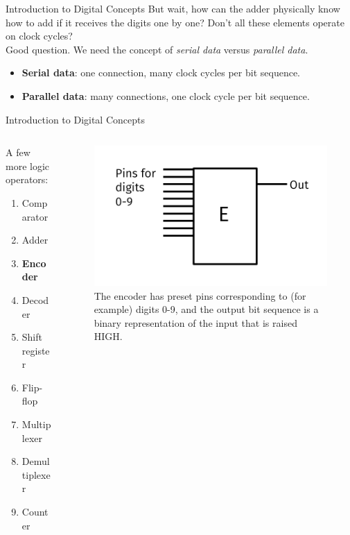 \documentclass{beamer}
\begin{document}
\begin{frame}{Introduction to Digital Concepts}
But wait, how can the adder physically know how to add if it receives the digits one by one?  Don't all these elements operate on clock cycles? \\ \vspace{0.5cm}
Good question.  We need the concept of \textit{serial data} versus \textit{parallel data}. \\ \vspace{0.5cm}
\begin{itemize}
\item \textbf{Serial data}: one connection, many clock cycles per bit sequence.
\item \textbf{Parallel data}: many connections, one clock cycle per bit sequence.
\end{itemize}
\end{frame}

\begin{frame}{Introduction to Digital Concepts}
\begin{columns}[T]
\begin{column}{0.5\textwidth}
A few more logic operators:
\begin{enumerate}
\item Comparator
\item Adder
\item \textbf{\alert{Encoder}}
\item Decoder
\item Shift register
\item Flip-flop
\item Multiplexer
\item Demultiplexer
\item Counter
\end{enumerate}
\end{column}
\begin{column}{0.5\textwidth}
\begin{figure}
\centering
\includegraphics[width=\textwidth]{figures/Encoder.pdf}
\caption{\label{fig:encoder} The encoder has preset pins corresponding to (for example) digits 0-9, and the output bit sequence is a binary representation of the input that is raised HIGH.}
\end{figure}
\end{column}
\end{columns}
\end{frame}
\end{document}
